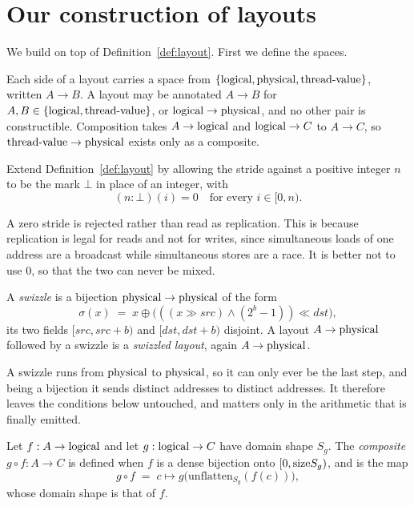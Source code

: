 \section{Our construction of layouts}\label{sec:layouts}

We build on top of Definition~\ref{def:layout}. First we define the spaces.

\begin{definition}[Spaces]\label{def:spaces}
Each side of a layout carries a space from $\{\textrm{logical}, \textrm{physical}, \textrm{thread-value}\}$,
written $A \to B$. A layout may be annotated $A \to B$ for
$A, B \in \{\textrm{logical}, \textrm{thread-value}\}$, or $\textrm{logical} \to \textrm{physical}$, and no other pair is
constructible. Composition takes $A \to \textrm{logical}$ and $\textrm{logical} \to C$ to
$A \to C$, so $\textrm{thread-value} \to \textrm{physical}$ exists only as a composite.
\end{definition}

\begin{definition}[Replication]\label{def:linear}
Extend Definition~\ref{def:layout} by allowing the stride against a positive
integer $n$ to be the mark $\bot$ in place of an integer, with
\[
(n{:}\bot)(i) = 0 \quad\text{for every } i \in [0,n).
\]
\end{definition}

A zero stride is rejected rather than read as replication. This is because
replication is legal for reads and not for writes, since simultaneous loads of
one address are a broadcast while simultaneous stores are a race. It is better
not to use $0$, so that the two can never be mixed.

\begin{definition}\label{def:swizzle}
A \emph{swizzle} is a bijection $\textrm{physical} \to \textrm{physical}$ of the form
\[
\sigma(x) \;=\; x \oplus \big(((x \gg \mathit{src}) \wedge (2^{b}-1)) \ll
\mathit{dst}\big),
\]
its two fields $[\mathit{src},\mathit{src}{+}b)$ and
$[\mathit{dst},\mathit{dst}{+}b)$ disjoint. A layout $A \to \textrm{physical}$
followed by a swizzle is a \emph{swizzled layout}, again $A \to \textrm{physical}$.
\end{definition}

A swizzle runs from $\textrm{physical}$ to $\textrm{physical}$, so it can only ever be the last
step, and being a bijection it sends distinct addresses to distinct addresses.
It therefore leaves the conditions below untouched, and matters only in the
arithmetic that is finally emitted.

\begin{definition}[Composition]\label{def:compose}
Let $f : A \to \textrm{logical}$ and let $g : \textrm{logical} \to C$ have domain shape $S_g$.
The \emph{composite} $g \circ f : A \to C$ is defined when $f$ is a dense
bijection onto $[0, \mathrm{size} S_g)$, and is the map
\[
g \circ f \;=\; c \mapsto g\big(\mathrm{unflatten}_{S_g}(f(c))\big),
\]
whose domain shape is that of $f$.
\end{definition}


